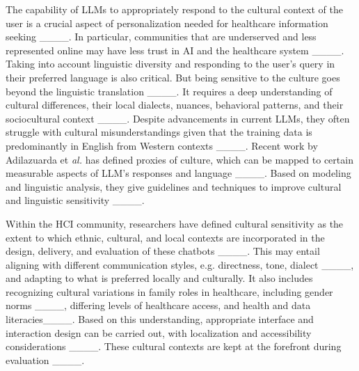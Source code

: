 The capability of LLMs to appropriately respond to the cultural context of the user is a crucial aspect of personalization needed for healthcare information seeking ____. In particular, communities that are underserved and less represented online may have less trust in AI and the healthcare system ____. Taking into account linguistic diversity and responding to the user’s query in their preferred language is also critical. But being sensitive to the culture goes beyond the linguistic translation ____. It requires a deep understanding of cultural differences, their local dialects, nuances, behavioral patterns, and their sociocultural context ____. Despite advancements in current LLMs, they often struggle with cultural misunderstandings given that the training data is predominantly in English from Western contexts ____. Recent work by Adilazuarda et \textit{al.} has defined proxies of culture, which can be mapped to certain measurable aspects of LLM’s responses and language ____. Based on modeling and linguistic analysis, they give guidelines and techniques to improve cultural and linguistic sensitivity ____. 




Within the HCI community, researchers have defined cultural sensitivity as the extent to which ethnic, cultural, and local contexts are incorporated in the design, delivery, and evaluation of these chatbots ____. This may entail aligning with different communication styles, e.g. directness, tone, dialect ____, and adapting to what is preferred locally and culturally. It also includes recognizing cultural variations in family roles in healthcare, including gender norms ____, differing levels of healthcare access, and health and data literacies____. 
Based on this understanding, appropriate interface and interaction design can be carried out, with localization and accessibility considerations ____. 
These cultural contexts are kept at the forefront during evaluation ____. 

